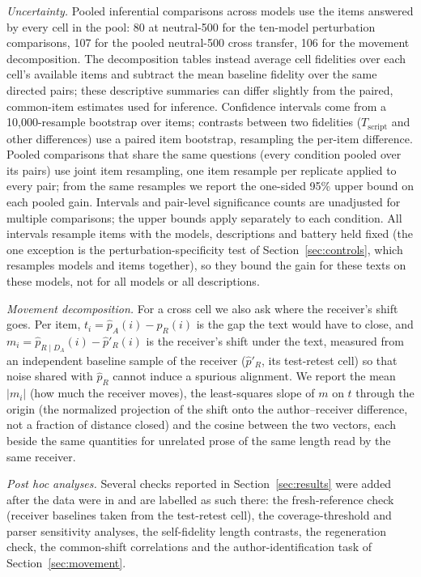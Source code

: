 \documentclass[11pt]{article}
\newcommand{\Tscript}{T_{\mathrm{script}}}
\begin{document}
\emph{Uncertainty.} Pooled inferential comparisons
across models use the items answered by every cell in the pool: 80 at
neutral-500 for the ten-model perturbation comparisons, 107 for the pooled
neutral-500 cross transfer, 106 for the movement decomposition. The decomposition
tables instead average cell fidelities over each cell's available items and
subtract the mean baseline fidelity over the same directed pairs; these
descriptive summaries can differ slightly from the paired, common-item
estimates used for inference. Confidence intervals come from a 10{,}000-resample
bootstrap over items; contrasts between two fidelities ($\Tscript$ and other
differences) use a paired item bootstrap, resampling the per-item difference.
Pooled comparisons that share the same questions (every condition pooled
over its pairs) use joint item resampling, one item resample per replicate
applied to every pair; from the same resamples we report the one-sided 95\%
upper bound on each pooled gain. Intervals and pair-level significance counts
are unadjusted for multiple comparisons; the upper bounds apply separately
to each condition. All intervals resample items with the
models, descriptions and battery held fixed (the one exception is the
perturbation-specificity test of Section~\ref{sec:controls}, which resamples
models and items together), so they bound the gain for
these texts on these models, not for all models or all descriptions.

\emph{Movement decomposition.} For a cross cell we also ask
where the receiver's shift goes. Per item, $t_i = \hat p_A(i) - \hat p_R(i)$
is the gap the text would have to close, and
$m_i = \hat p_{R\mid D_A}(i) - \hat p'_R(i)$ is the receiver's shift under the
text, measured from an independent baseline sample of the receiver
($\hat p'_R$, its test-retest cell) so that noise shared with $\hat p_R$
cannot induce a spurious alignment. We report the mean $|m_i|$ (how much
the receiver moves), the least-squares slope of $m$ on $t$ through the
origin (the normalized projection of the shift onto the author--receiver
difference, not a fraction of distance closed) and the cosine between
the two vectors, each beside the same quantities for unrelated prose of the
same length read by the same receiver.

\emph{Post hoc analyses.} Several checks reported in Section~\ref{sec:results}
were added after the data were in and are labelled as such there: the
fresh-reference check (receiver baselines taken from the test-retest cell),
the coverage-threshold and parser sensitivity analyses, the self-fidelity
length contrasts, the regeneration check, the common-shift correlations
and the author-identification task of Section~\ref{sec:movement}.
\end{document}
